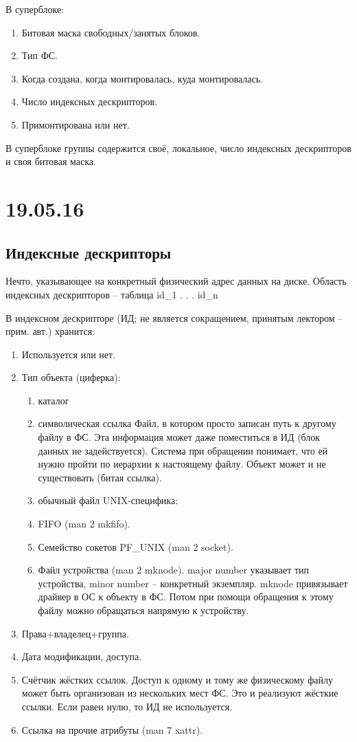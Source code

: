 \documentclass[a4paper,10pt]{article}
\begin{document}
В суперблоке:
\begin{enumerate}
 \item Битовая маска свободных/занятых блоков.
 \item Тип ФС.
 \item Когда создана, когда монтировалась, куда монтировалась.
 \item Число индексных дескрипторов.
 \item Примонтирована или нет.
\end{enumerate}
В суперблоке группы содержится своё, локальное, число индексных дескрипторов и своя битовая маска.

\section{19.05.16}
\subsection{Индексные дескрипторы}
Нечто, указывающее на конкретный физический адрес данных на диске.
Область индексных дескрипторов -- таблица 
id\_1
.
.
.
id\_n

В индексном дескрипторе (ИД; не является сокращением, принятым лектором -- прим. авт.) хранится:
\begin{enumerate}
 \item Используется или нет.
 \item Тип объекта (циферка):
 \begin{enumerate}
 \item каталог
 \item символическая ссылка
 Файл, в котором просто записан путь к другому файлу в ФС. Эта информация может даже поместиться в ИД (блок данных не задействуется). Система при обращении понимает, что ей нужно пройти по иерархии к настоящему файлу.
 Объект может и не существовать (битая ссылка).
 \item обычный файл 
 UNIX-специфика:
 \item FIFO (man 2 mkfifo).
 \item Семейство сокетов PF\_UNIX (man 2 socket).
 \item Файл устройства (man 2 mknode).
 major number указывает тип устройства, minor number -- конкретный экземпляр.
 mknode привязывает драйвер в ОС к объекту в ФС. Потом при помощи обращения к этому файлу можно обращаться напрямую к устройству.
\end{enumerate}
\item Права+владелец+группа.
\item Дата модификации, доступа.
\item Счётчик жёстких ссылок. Доступ к одному и тому же физическому файлу может быть организован из нескольких мест ФС. Это и реализуют жёсткие ссылки. Если равен нулю, то ИД не используется.
\item Ссылка на прочие атрибуты (man 7 xattr).
\end{enumerate}
\end{document}
